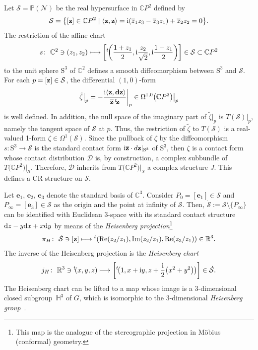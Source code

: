 \documentclass[pdftex]{sigma}
\numberwithin{equation}{section}
\def\C{\mathbb{C}}
\def\R{\mathbb{R}}
\def\CP{\mathbb{CP}}
\def\H{\mathbb{H}}
\def\S{\mathcal{S}}
\def\CP{\mathbb{C}P}
\def\S{\mathcal{S}}
\begin{document}
%
Let $\mathcal{S}= \mathbb{P}(\mathcal{N})$ be the real hypersurface in $\CP^2$ defined by
%
\begin{equation*}
\mathcal S =\big\{[{\bf z}] \in \CP^2 \mid \langle \mathbf{z},\mathbf{z} \rangle
= {\rm i}(\overline{z}_1z_3-\overline{z}_3z_1)+\overline{z}_2z_2=0\big\}.
 \end{equation*}
The restriction of the affine chart
\begin{equation*}
 s\colon \ \C^2 \ni (z_1,z_2) \longmapsto
 \left[{^t\!\bigg(}\frac{1+z_1}{2},{\rm i}\frac{z_2}{\sqrt{2}},{\rm i}\frac{1-z_1}{2}\bigg)\right]\in \mathcal S\subset \CP^2
 \end{equation*}
to the unit sphere ${\mathrm S}^3$ of $\C^2$ defines a smooth diffeomorphism
between ${\mathrm S}^3$ and $\mathcal{S}$.
For each $p=[{\bf z}]\in \mathcal{S}$, the differential $(1,0)$-form
\begin{equation*}%
 \tilde\zeta\big|_p =
 - \frac{{\rm i} \langle \bf{z},d{\bf z}\rangle}{\overline{{\bf z}} \, {^t\!\bf z}} \bigg|_p \in \Omega^{1,0}\big(\CP^2\big)\big|_p
 \end{equation*}
is well defined. In addition, the null space of the imaginary part of $\tilde\zeta|_p$ is
${{T}(\mathcal{S})}|_p$, namely the tangent space of $\mathcal{S}$ at $p$.
Thus, the restriction of $\tilde\zeta$ to ${{T}(\mathcal{S})}$ is a real-valued 1-form $\zeta\in\Omega^1(\mathcal{S})$.
Since the pullback of $\zeta$ by the diffeomorphism $s\colon \mathrm{S}^3\to\mathcal{S}$ is the standard contact
form ${\rm i}\overline{{\bf z}}\cdot d{{\bf z}}|_{\mathrm{S}^3}$ of $\mathrm{S}^3$, then $\zeta$ is a contact
form whose contact distribution $\mathcal{D}$ is, by construction, a complex subbundle
of ${{T}\big(\CP^2\big)\big|_{\mathcal{S}}}$. Therefore, $\mathcal{D}$ inherits
from ${{T}\big(\CP^2\big)\big|_{\mathcal{S}}}$ a complex structure $J$. This defines a CR structure on $\mathcal{S}$.


Let $\mathbf{e}_1$, $\mathbf{e}_2$, $\mathbf{e}_3$ denote the standard basis of $\mathbb C^3$.
Consider ${P}_{0}=[\mathbf{e}_1]
\in {\mathcal S}$ and ${P}_{\infty}=[\mathbf{e}_3]
\in {\mathcal S}$ as the origin
and the point at infinity of $\S$. Then, $\dot{\S}:= \S\setminus\{P_\infty\}$ can be identified with
Euclidean 3-space with its standard contact structure
${\rm d}z - y{\rm d}x + x{\rm d}y$
by means of the {\em Heisenberg projection}\footnote{This map is the analogue of the stereographic projection in M\"obius (conformal) geometry.}
\[
 \pi_H\colon \ \dot{\S}\ni [{\bf z}]\longmapsto {^t\!\left(\operatorname{Re}(z_2/z_1),\operatorname{Im}(z_2/z_1),\operatorname{Re}(z_3/z_1)\right)}\in \R^3.
\]
The inverse of the Heisenberg projection is the {\em Heisenberg chart}
\[
 j_H \colon \ \R^3 \ni {^t\!(}x, y, z) \longmapsto \bigg[{^t\!\big(}1,x+{\rm i}y,z+\frac{{\rm i}}{2}\big(x^2+y^2\big)\big)\bigg]\in\dot{\S}.
\]
The Heisenberg chart can be lifted to a map
 whose image is a 3-dimensional closed subgroup~$\H^3$ of ${G}$,
 which is isomorphic to the 3-dimensional {\em Heisenberg group}~\cite{MNS-Kharkiv}.
\end{document}
